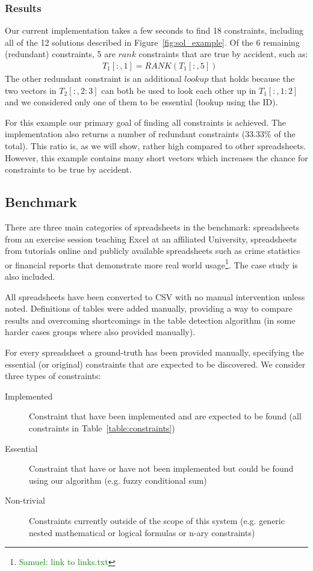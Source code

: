 \documentclass{sig-alternate-05-2015}
\newcommand{\samuel}[1]{\textcolor{green}{{\sc Samuel:} #1}\xspace}
\newcommand{\range}[3]{\ensuremath{#1[#2,#3]}}
\newcommand{\rangeto}[2]{#1{:}#2}
\newcommand{\rangeall}{:}
\newcommand{\eccalc}[2]{\ensuremath{#1 = #2}}
\newcommand{\ecrank}[2]{\eccalc{#1}{\mathit{RANK}(#2)}}
\begin{document}
\subsubsection{Results}
Our current implementation takes a few seconds to find 18 constraints, including all of the 12 solutions described in Figure~\ref{fig:sol_example}.
Of the 6 remaining (redundant) constraints, 5 are $\mathit{rank}$ constraints that are true by accident, such as: \begin{align*}
  & \ecrank{\range{T_1}{\rangeall}{1}}{\range{T_1}{\rangeall}{5}}
\end{align*}
The other redundant constraint is an additional $\mathit{lookup}$ that holds because the two vectors in \range{T_2}{\rangeall}{\rangeto{2}{3}} can both be used to look each other up in \range{T_1}{\rangeall}{\rangeto{1}{2}} and we considered only one of them to be essential (lookup using the ID).

For this example our primary goal of finding all constraints is achieved.
The implementation also returns a number of redundant constraints ($33.33\%$ of the total).
This ratio is, as we will show, rather high compared to other spreadsheets.
However, this example contains many short vectors which increases the chance for constraints to be true by accident.

\subsection{Benchmark}
There are three main categories of spreadsheets in the benchmark: spreadsheets from an exercise session teaching Excel at an affiliated University, spreadsheets from tutorials online and publicly available spreadsheets such as crime statistics or financial reports that demonstrate more real world usage\footnote{\samuel{link to links.txt}}.
The case study is also included.

All spreadsheets have been converted to CSV with no manual intervention unless noted.
Definitions of tables were added manually, providing a way to compare results and overcoming shortcomings in the table detection algorithm (in some harder cases groups where also provided manually).

For every spreadsheet a ground-truth has been provided manually, specifying the essential (or original) constraints that are expected to be discovered.
We consider three types of constraints:
\begin{description}
  \item[Implemented] Constraint that have been implemented and are expected to be found (all constraints in Table~\ref{table:constraints})
  \item[Essential] Constraint that have or have not been implemented but could be found using our algorithm (e.g. fuzzy conditional sum)
  \item[Non-trivial] Constraints currently outside of the scope of this system (e.g. generic nested mathematical or logical formulas or n-ary constraints)
\end{description}
\end{document}

